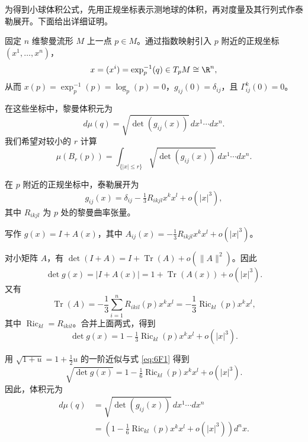 
为得到小球体积公式，先用正规坐标表示测地球的体积，再对度量及其行列式作泰勒展开。下面给出详细证明。


固定 $n$ 维黎曼流形 $M$ 上一点 $p\in M$。通过指数映射引入 $p$ 附近的正规坐标 $(x^1,\ldots,x^n)$，
\[
  x=(x^i)=\exp_p^{-1}(q)\in T_pM\cong\R^n,
\]
从而 $x(p)=\exp_p^{-1}(p)=\log_p(p)=0$，$g_{ij}(0)=\delta_{ij}$，且 $\Gamma^k_{ij}(0)=0$。

在这些坐标中，黎曼体积元为
\[
  d\mu(q)=\sqrt{\det(g_{ij}(x))}\,dx^1\cdots dx^n.
\]
我们希望对较小的 $r$ 计算
\[
  \mu(B_r(p))=\int_{\{|x|\leq r\}}\sqrt{\det(g_{ij}(x))}\,dx^1\cdots dx^n.
\]


在 $p$ 附近的正规坐标中，泰勒展开为
\[
  g_{ij}(x)=\delta_{ij}-\tfrac13 R_{ikjl}x^kx^l+o(|x|^3),
\]
其中 $R_{ikjl}$ 为 $p$ 处的黎曼曲率张量。


写作 $g(x)=I+A(x)$，其中 $A_{ij}(x)=-\tfrac13R_{ikjl}x^kx^l+o(|x|^3)$。

对小矩阵 $A$，有 $\det(I+A)=I+\operatorname{Tr}(A)+o(\lVert A\rVert^2)$。因此
\[
  \det g(x)=|I+A(x)|=1+\operatorname{Tr}(A(x))+o(|x|^3).
\]
又有
\[
  \operatorname{Tr}(A)
    =-\frac13\sum_{i=1}^n R_{ikil}(p)x^kx^l
    =-\frac13\operatorname{Ric}_{kl}(p)x^kx^l,
\]
其中 $\operatorname{Ric}_{kl}=R_{ikil}$。合并上面两式，得到
\begin{equation*}
  \det g(x)=1-\tfrac13\operatorname{Ric}_{kl}(p)x^kx^l+o(|x|^3).
  \tag{6F1}\label{eq:6F1}
\end{equation*}


用 $\sqrt{1+u}=1+\tfrac12u$ 的一阶近似与式 \eqref{eq:6F1} 得到
\begin{equation*}
  \sqrt{\det g(x)}=1-\tfrac16\operatorname{Ric}_{kl}(p)x^kx^l+o(|x|^3).
  \tag{6F2}\label{eq:6F2}
\end{equation*}
因此，体积元为
\begin{equation*}
  \begin{aligned}
  d\mu(q)&=\sqrt{\det(g_{ij}(x))}\,dx^1\cdots dx^n\\
         &=\left(1-\tfrac16\operatorname{Ric}_{kl}(p)x^kx^l+o(|x|^3)\right)d^nx.
  \end{aligned}
  \tag{6F3}\label{eq:6F3}
\end{equation*}

